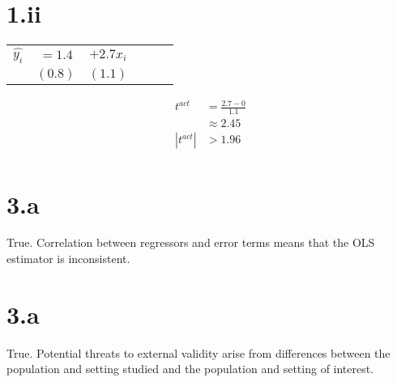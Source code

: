 \documentclass[letterpaper,12pt,titlepage,oneside,final]{book}
\begin{document}
\section*{1.ii}
\begin{center}
\begin{tabular}{c c c c c c} 
$\widehat{y_i}$ & $= 1.4$ & $+ 2.7x_{i}$\\
 & $(0.8)$ & $(1.1)$ \\
\end{tabular}
\end{center}

\begin{align*}
t^{act} &= \frac{2.7 - 0}{1.1}\\
&\approx 2.45 \\
|t^{act}|&> 1.96\\
\end{align*}

\section*{3.a}
True. Correlation between regressors and error terms means that the OLS estimator is inconsistent.  
\section*{3.a}
True. Potential threats to external validity arise from differences between the population and setting studied and the population and setting of interest.
\end{document}
